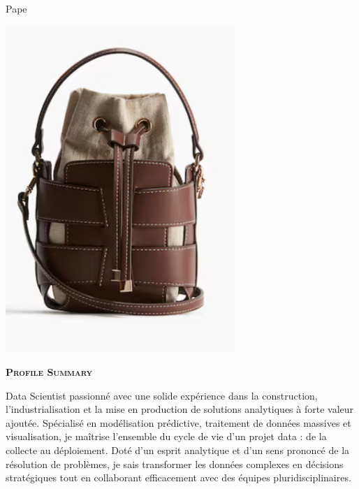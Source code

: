 \documentclass[11pt,a4paper]{article}
\newcommand{\headleft}[1]{\vspace*{3ex}\textsc{\textbf{#1}}\par%
    \vspace*{-1.5ex}\hrulefill\par\vspace*{0.7ex}}
\begin{document}
\setlength{\topskip}{0pt}\setlength{\parindent}{0pt}\setlength{\parskip}{0pt}
\setlength{\fboxsep}{0pt}\pagestyle{empty}\raggedbottom

\begin{minipage}[t]{0.33\textwidth}
\colorbox{cvblue}{\begin{minipage}[t][5mm][t]{\textwidth}\null\hfill\null\end{minipage}}
\vspace{-.2ex}
\colorbox{cvblue!90}{\color{white}
\textwidth
\begin{minipage}[t][293mm][t]{0.82\textwidth}\raggedright
\vspace*{2.5ex}

\Large Pape \textbf{\textscFALL} \normalsize


\null\hfill\includegraphics[width=0.65\textwidth]{ 541f42e2ca2145b78bb27ac7497aa0ee.png }\hfill\null


\vspace*{0.5ex}

\headleft{Profile Summary}
Data Scientist passionné avec une solide expérience dans la construction, l’industrialisation et la mise en production de solutions analytiques à forte valeur ajoutée. Spécialisé en modélisation prédictive, traitement de données massives et visualisation, je maîtrise l’ensemble du cycle de vie d’un projet data : de la collecte au déploiement. Doté d’un esprit analytique et d’un sens prononcé de la résolution de problèmes, je sais transformer les données complexes en décisions stratégiques tout en collaborant efficacement avec des équipes pluridisciplinaires.


\end{minipage}}
\end{minipage}
\end{document}
